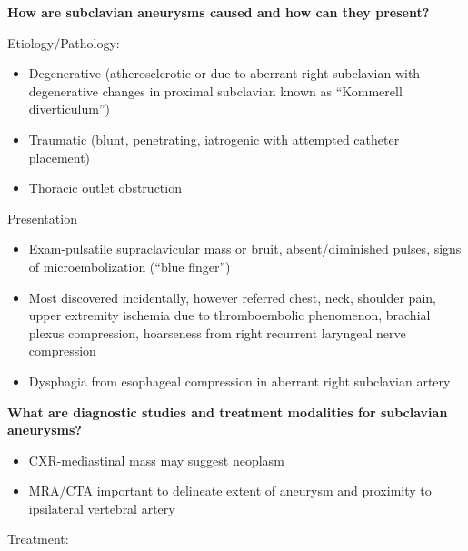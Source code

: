 \documentclass[
]{book}
\providecommand{\tightlist}{%
  \setlength{\itemsep}{0pt}\setlength{\parskip}{0pt}}
\begin{document}
\textbf{How are subclavian aneurysms caused and how can they present?}
\citet{baig84UpperExtremity2019}

Etiology/Pathology:

\begin{itemize}
\item
  Degenerative (atherosclerotic or due to aberrant right subclavian
  with degenerative changes in proximal subclavian known as ``Kommerell
  diverticulum'')
\item
  Traumatic (blunt, penetrating, iatrogenic with attempted catheter
  placement)~
\item
  Thoracic outlet obstruction
\end{itemize}

Presentation

\begin{itemize}
\tightlist
\item
  Exam-pulsatile supraclavicular mass or bruit, absent/diminished
  pulses, signs of microembolization (``blue finger'')
\item
  Most discovered incidentally, however referred chest, neck, shoulder
  pain, upper extremity ischemia due to thromboembolic phenomenon,
  brachial plexus compression, hoarseness from right recurrent
  laryngeal nerve compression
\item
  Dysphagia from esophageal compression in aberrant right subclavian
  artery
\end{itemize}

\textbf{What are diagnostic studies and treatment modalities for subclavian
aneurysms?}

\begin{itemize}
\item
  CXR-mediastinal mass may suggest neoplasm
\item
  MRA/CTA important to delineate extent of aneurysm and proximity to
  ipsilateral vertebral artery~
\end{itemize}

Treatment:~
\end{document}
